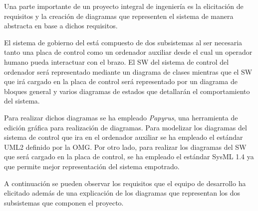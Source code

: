 Una parte importante de un proyecto integral de ingeniería es la elicitación de requisitos y la creación de diagramas que representen el sistema de manera abstracta en base a dichos requisitos.

El sistema de gobierno del \pArm{} está compuesto de dos subsistemas al ser necesaria tanto una placa de control como un ordenador auxiliar desde el cual un operador humano pueda interactuar con el brazo. El \ac{SW} del sistema de control del ordenador será representado mediante un diagrama de clases mientras que el \ac{SW} que irá cargado en la placa de control será representado por un diagrama de bloques general y varios diagramas de estados que detallarán el comportamiento del sistema.

Para realizar dichos diagramas se ha empleado \textit{Papyrus}, una herramienta de edición gráfica para realización de diagramas. Para modelizar los diagramas del sistema de control que ira en el ordenador auxiliar se ha empleado el estándar UML2 definido por la OMG. Por otro lado, para realizar los diagramas del \ac{SW} que será cargado en la placa de control, se ha empleado el estándar SysML 1.4 ya que permite mejor representación del sistema empotrado.

A continuación se pueden observar los requisitos que el equipo de desarrollo ha elicitado además de una explicación de los diagramas que representan los dos subsistemas que componen el proyecto.
